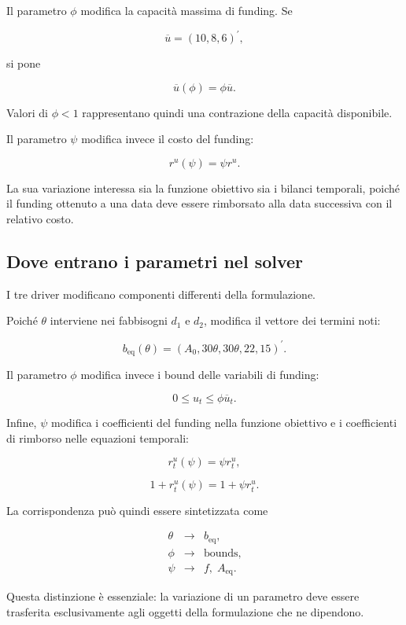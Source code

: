 Il parametro $\phi$ modifica la capacit\`a massima di funding. Se

$$
\overline{u}
=
\left(
10,8,6
\right)^{\prime},
$$

\noindent si pone

$$
\overline{u}(\phi)
=
\phi\overline{u}.
$$

Valori di $\phi<1$ rappresentano quindi una contrazione della capacit\`a
disponibile.

Il parametro $\psi$ modifica invece il costo del funding:

$$
r^u(\psi)
=
\psi r^u.
$$

La sua variazione interessa sia la funzione obiettivo sia i bilanci
temporali, poich\'e il funding ottenuto a una data deve essere rimborsato alla
data successiva con il relativo costo.

\subsection{Dove entrano i parametri nel solver}

I tre driver modificano componenti differenti della formulazione.

Poich\'e $\theta$ interviene nei fabbisogni $d_1$ e $d_2$, modifica il vettore
dei termini noti:

$$
b_{\mathrm{eq}}(\theta)
=
\left(
A_0,
30\theta,
30\theta,
22,
15
\right)^{\prime}.
$$

Il parametro $\phi$ modifica invece i bound delle variabili di funding:

$$
0
\leq
u_t
\leq
\phi\overline{u}_t.
$$

Infine, $\psi$ modifica i coefficienti del funding nella funzione obiettivo e
i coefficienti di rimborso nelle equazioni temporali:

$$
r_t^u(\psi)
=
\psi r_t^u,
$$

$$
1+r_t^u(\psi)
=
1+\psi r_t^u.
$$

La corrispondenza pu\`o quindi essere sintetizzata come

$$
\begin{array}{ccl}
\theta
&\longrightarrow&
b_{\mathrm{eq}},
\\[4pt]
\phi
&\longrightarrow&
\text{bounds},
\\[4pt]
\psi
&\longrightarrow&
f,\;A_{\mathrm{eq}}.
\end{array}
$$

Questa distinzione \`e essenziale: la variazione di un parametro deve essere
trasferita esclusivamente agli oggetti della formulazione che ne dipendono.

